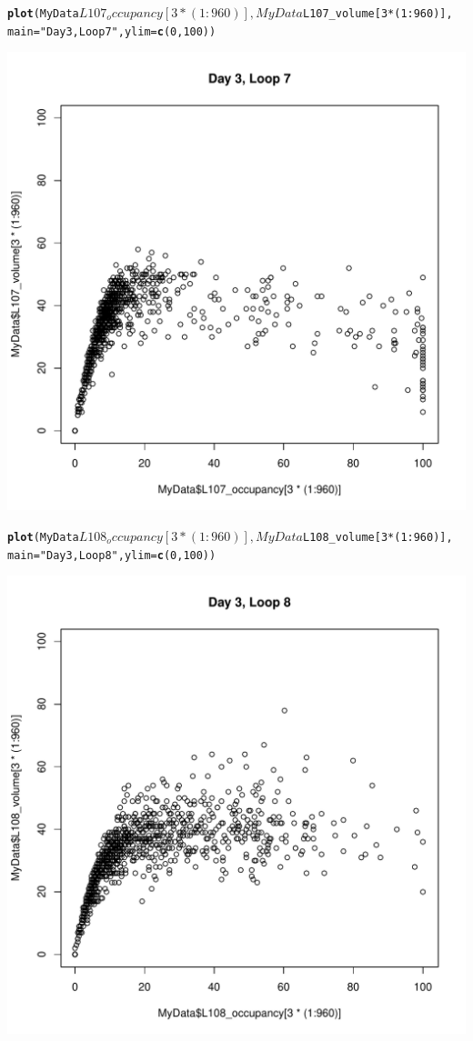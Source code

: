 \documentclass[review, authoryear]{elsarticle}\usepackage{graphicx, color}
\makeatletter
\def\maxwidth{ %
  \ifdim\Gin@nat@width>\linewidth
    \linewidth
  \else
    \Gin@nat@width
  \fi
}
\newcommand{\hlfunctioncall}[1]{\textcolor[rgb]{0.501960784313725,0,0.329411764705882}{\textbf{#1}}}%
\newcommand{\hlstring}[1]{\textcolor[rgb]{0.6,0.6,1}{#1}}%
\newenvironment{kframe}{%
 \def\at@end@of@kframe{}%
 \ifinner\ifhmode%
  \def\at@end@of@kframe{\end{minipage}}%
  \begin{minipage}{\columnwidth}%
 \fi\fi%
 \def\FrameCommand##1{\hskip\@totalleftmargin \hskip-\fboxsep
 \colorbox{shadecolor}{##1}\hskip-\fboxsep
     \hskip-\linewidth \hskip-\@totalleftmargin \hskip\columnwidth}%
 \MakeFramed {\advance\hsize-\width
   \@totalleftmargin\z@ \linewidth\hsize
   \@setminipage}}%
 {\par\unskip\endMakeFramed%
 \at@end@of@kframe}
\newenvironment{knitrout}{}{} %
\makeatother
\begin{document}
\begin{knitrout}
\begin{kframe}
\begin{alltt}
\hlfunctioncall{plot}(MyData$L107_occupancy[3 * (1:960)], MyData$L107_volume[3 * (1:960)], 
    main = \hlstring{"Day 3, Loop 7"}, ylim = \hlfunctioncall{c}(0, 100))
\end{alltt}
\end{kframe}\includegraphics[width=\maxwidth]{figure/unnamed-chunk-16} \begin{kframe}\begin{alltt}
\hlfunctioncall{plot}(MyData$L108_occupancy[3 * (1:960)], MyData$L108_volume[3 * (1:960)], 
    main = \hlstring{"Day 3, Loop 8"}, ylim = \hlfunctioncall{c}(0, 100))
\end{alltt}
\end{kframe}\includegraphics[width=\maxwidth]{figure/unnamed-chunk-17} 
\end{knitrout}
\end{document}
